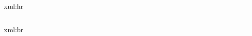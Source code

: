 \startxmlsetups xml:hr
  \blank
  \hrule
  \blank
\stopxmlsetups

\startxmlsetups xml:br
  \par
\stopxmlsetups

